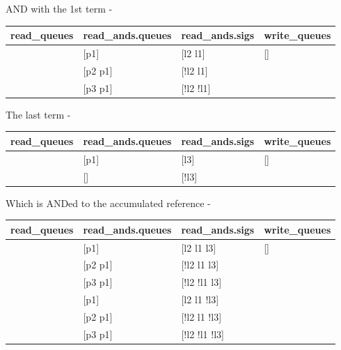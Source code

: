 \documentclass[10pt,a4paper,twoside,fleqn]{book}
\begin{document}
            AND with the 1st term -

            \begin{tabular}{| l | l | l | l |}
            \hline
            read\_queues  & read\_ands.queues & read\_ands.sigs & write\_queues    \\
            \hline
            [p1 p2 p3]   & [p1]             & [l2 l1]         & []              \\
                         & [p2 p1]          & [!l2 l1]        &                 \\
                         & [p3 p1]          & [!l2 !l1]       &                 \\
            \hline    
            \end{tabular}

            The last term -

            \begin{tabular}{| l | l | l | l |}
            \hline
            read\_queues  & read\_ands.queues & read\_ands.sigs & write\_queues    \\
            \hline
            [p1]         & [p1]             & [l3]            & []              \\
                         & []               & [!l3]           &                 \\
            \hline    
            \end{tabular}

            Which is ANDed to the accumulated reference -

            \begin{tabular}{| l | l | l | l |}
            \hline
            read\_queues  & read\_ands.queues & read\_ands.sigs & write\_queues    \\
            \hline
            [p1 p2 p3]   & [p1]             & [l2 l1 l3]      & []              \\
                         & [p2 p1]          & [!l2 l1 l3]     &                 \\
                         & [p3 p1]          & [!l2 !l1 l3]    &                 \\
                         & [p1]             & [l2 l1 !l3]     &                 \\
                         & [p2 p1]          & [!l2 l1 !l3]    &                 \\
                         & [p3 p1]          & [!l2 !l1 !l3]   &                 \\
            \hline        
            \end{tabular}
\end{document}

